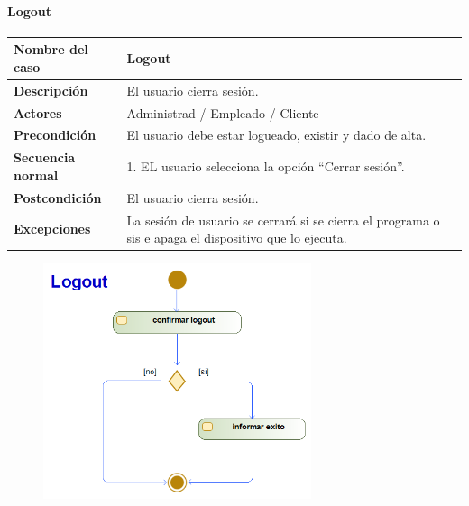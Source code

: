 \paragraph{Logout}
\begin{table}[H]
    \centering
    \small
    \begin{tabularx}{0.8\textwidth}{|p{3.5cm}|X|}
        \hline
        \rowcolor{lightgray}
        \textbf{Nombre del caso}  & \textbf{Logout}                                                                                       \\
        \hline
        \textbf{Descripción}      & El usuario cierra sesión.                                                                             \\
        \hline
        \textbf{Actores}          & Administrad / Empleado / Cliente                                                                      \\
        \hline
        \textbf{Precondición}     & El usuario debe estar logueado, existir y dado de alta.                                               \\
        \hline
        \textbf{Secuencia normal} & 1. EL usuario selecciona la opción ``Cerrar sesión''. \newline                                        \\
        \hline
        \textbf{Postcondición}    & El usuario cierra sesión.                                                                             \\
        \hline
        \textbf{Excepciones}      & La sesión de usuario se cerrará si se cierra el programa o sis e apaga el dispositivo que lo ejecuta. \\
        \hline
    \end{tabularx}
\end{table}
\begin{figure}[H]
    \centering
    \includegraphics[width=0.7\textwidth]{Use_Cases/Logout.png}
\end{figure}
\newpage
